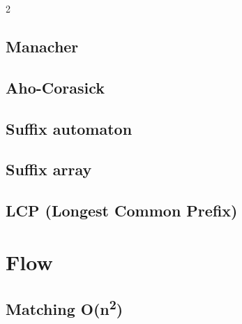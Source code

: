 \begin{multicols}{2}

\subsection{Manacher}

\subsection{Aho-Corasick}

\subsection{Suffix automaton}


\subsection{Suffix array}

\subsection{LCP (Longest Common Prefix)}


\section{Flow}

\subsection{Matching O(n\textsuperscript{2})}


\end{multicols}
